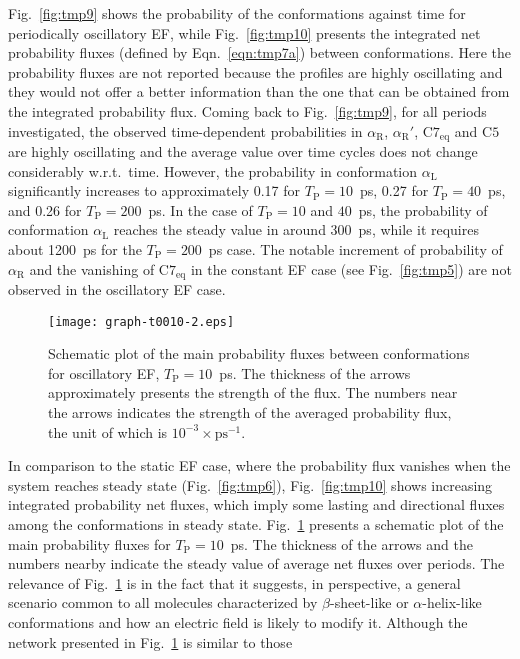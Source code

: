 \documentclass[journal=jctcce,manuscript=manuscript]{achemso}
\newcommand{\period}[0]{T_{\textrm{P}}}
\newcommand{\confaa}[0]{{\alpha_{\textrm{R}}}}
\newcommand{\confab}[0]{{\alpha_{\textrm{R}}'}}
\newcommand{\confba}[0]{{\textrm{C}7_{\textrm{eq}}}}
\newcommand{\confbb}[0]{{\textrm{C}5}}
\newcommand{\confc}[0]{{\alpha_{\textrm{L}}}}
\begin{document}
Fig.~\ref{fig:tmp9} shows the probability of the
conformations against time for periodically oscillatory EF,
while  
Fig.~\ref{fig:tmp10} presents the integrated net probability fluxes
(defined by Eqn.~\eqref{eqn:tmp7a}) between
conformations. Here the probability fluxes are not reported
because the profiles are highly oscillating and they would not offer 
a better information than the one that can be obtained from the integrated probability flux.
Coming back to Fig.~\ref{fig:tmp9}, for all periods investigated,
the observed time-dependent probabilities  in $\confaa$, $\confab$, $\confba$ and $\confbb$ are
highly oscillating and the average value over time cycles does not change
considerably w.r.t.~time.
However, the probability in conformation $\confc$ significantly
increases to approximately 0.17 for $\period =10$~ps, 0.27 for  $\period =40$~ps, and
0.26 for $\period =200$~ps.
In the case of $\period =10$ and $40$~ps, {the probability of conformation $\confc$}
reaches the steady value in around 300~ps, while it requires about 1200~ps
for the $\period =200$~ps case. 
The notable increment of probability of $\confaa$ and
  the vanishing of $\confba$ in the constant EF case (see Fig.~\ref{fig:tmp5})
are not observed in the oscillatory EF case.
\begin{figure}
  \centering
  \texttt{[image: graph-t0010-2.eps]}
  \caption{Schematic plot of the main probability fluxes between conformations
    for oscillatory EF, $\period =10$~ps. The thickness 
    of the arrows approximately presents the strength of the flux.
    The numbers near the arrows indicates the strength of the averaged
    probability flux, the unit of which is $10^{-3}\times\textrm{ps}^{-1}$.
  }
  \label{fig:tmp11}
\end{figure}
In comparison to the static EF case, where the probability flux
vanishes when the system reaches steady state (Fig.~\ref{fig:tmp6}), 
Fig.~\ref{fig:tmp10} shows increasing
integrated probability net fluxes, which imply some lasting and directional
fluxes among the conformations {in steady state}.
Fig.~\ref{fig:tmp11} presents
a schematic plot of the main probability fluxes for $\period =10$~ps.
The thickness of the arrows and the numbers nearby indicate
the steady value of average net fluxes over periods.
The relevance of Fig.~\ref{fig:tmp11} is in the fact that it suggests,
in perspective, a general scenario common to all molecules
characterized by $\beta$-sheet-like or $\alpha$-helix-like
conformations and how an electric field is likely to modify it.
  Although the network presented in Fig.~\ref{fig:tmp11} is similar to those
\end{document}
